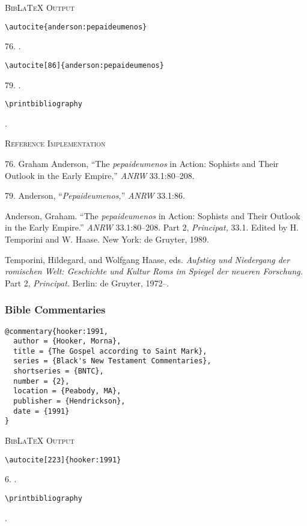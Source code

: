 \documentclass[a4paper]{article}
\newcommand\citetestns[3]{%
  {\textsc{BibLaTeX Output}\par
   \nobreak
   \texttt{\textbackslash autocite[#2]\{#3\}}\par
   \color{biblatex-colour}
   #1. \cite[#2]{#3}.\par
   \color{black}
   \texttt{\textbackslash printbibliography}\par
   \color{biblatex-colour}
   \sloppy\hangindent\bibindent\bibentrycite{#3}.\par}}
\newenvironment{refimp}{%
  \begin{minipage}{\linewidth}
    \setlength{\parskip}{1ex}
    \textsc{Reference Implementation}\par
    \nobreak
    \color{reference-colour}
}{\end{minipage}}
\begin{document}
{\textsc{BibLaTeX Output}\par
  \nobreak
  \texttt{\textbackslash autocite\{anderson:pepaideumenos\}}\par
  \color{biblatex-colour}
  76. \cite{anderson:pepaideumenos}.\par
  \color{black}
  \texttt{\textbackslash autocite[86]\{anderson:pepaideumenos\}}\par
  \color{biblatex-colour}
  79. \cite[86]{anderson:pepaideumenos}.\par
  \color{black}
  \texttt{\textbackslash printbibliography}\par
  \color{biblatex-colour}
  \sloppy\hangindent\bibindent{}.\par
\hangindent\bibindent{}\par}

\begin{refimp}
  76. Graham Anderson, “The \emph{pepaideumenos} in Action: Sophists and Their
  Outlook in the Early Empire,” \emph{ANRW} 33.1:80–208.

  79. Anderson, “\emph{Pepaideumenos,}” \emph{ANRW} 33.1:86.

  \hangindent\bibindent Anderson, Graham. “The \emph{pepaideumenos} in Action:
  Sophists and Their Outlook in the Early Empire.” \emph{ANRW} 33.1:80–208.
  Part 2, \emph{Principat,} 33.1. Edited by H. Temporini and W. Haase. New
  York: de Gruyter, 1989.

  \hangindent\bibindent Temporini, Hildegard, and Wolfgang Haase, eds.
  \emph{Aufstieg und Niedergang der romischen Welt: Geschichte und Kultur Roms
  im Spiegel der neueren Forschung.} Part 2, \emph{Principat.} Berlin: de
  Gruyter, 1972–.
\end{refimp}

\subsubsection{Bible Commentaries}

\begin{lstlisting}
@commentary{hooker:1991,
  author = {Hooker, Morna},
  title = {The Gospel according to Saint Mark},
  series = {Black's New Testament Commentaries},
  shortseries = {BNTC},
  number = {2},
  location = {Peabody, MA},
  publisher = {Hendrickson},
  date = {1991}
}
\end{lstlisting}  

\citetestns{6}{223}{hooker:1991}
\end{document}
